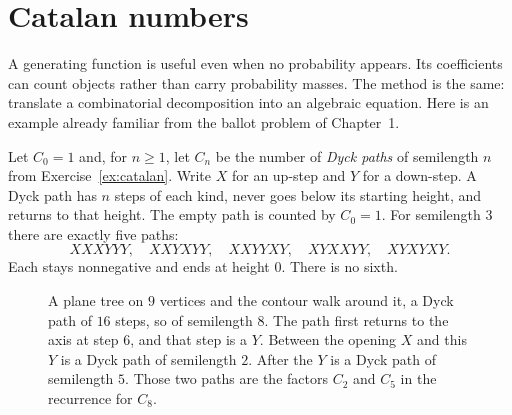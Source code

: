 \section{Catalan numbers}

A generating function is useful even when no probability appears. Its coefficients can count objects rather than carry probability masses. The method is the same: translate a combinatorial decomposition into an algebraic equation. Here is an example already familiar from the ballot problem of Chapter~1.

Let $C_0=1$ and, for $n\ge1$, let $C_n$ be the number of \emph{Dyck paths} of semilength $n$ from Exercise~\ref{ex:catalan}. Write $X$ for an up-step and $Y$ for a down-step. A Dyck path has $n$ steps of each kind, never goes below its starting height, and returns to that height. The empty path is counted by $C_0=1$. For semilength $3$ there are exactly five paths:
\[
 XXXYYY,\quad XXYXYY,\quad XXYYXY,\quad XYXXYY,\quad XYXYXY.
\]
Each stays nonnegative and ends at height $0$. There is no sixth.

\begin{figure}[ht]
\centering
{}
\caption{A plane tree on $9$ vertices and the contour walk around it, a Dyck path of $16$ steps, so of semilength $8$. The path first returns to the axis at step $6$, and that step is a $Y$. Between the opening $X$ and this $Y$ is a Dyck path of semilength $2$. After the $Y$ is a Dyck path of semilength $5$. Those two paths are the factors $C_2$ and $C_5$ in the recurrence for $C_8$.}
\label{fig:contour}
\end{figure}

